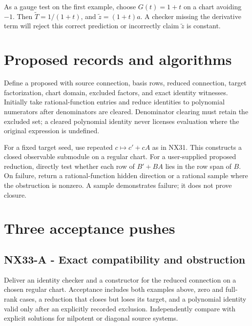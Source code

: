 \documentclass[
  11pt,
  a4paper,
]{report}
\let\nxtexttt\texttt
\renewcommand{\texttt}[1]{\nxtexttt{\seqsplit{#1}}}
\begin{document}
As a gauge test on the first example, choose \(G(t)=1+t\) on a chart
avoiding \(-1\). Then \(\widetilde T=1/(1+t)\), and
\(\widetilde z=(1+t)a\). A checker missing the derivative term will
reject this correct prediction or incorrectly claim \(\widetilde z\) is
constant.

\hypertarget{proposed-records-and-algorithms}{%
\section{Proposed records and
algorithms}\label{proposed-records-and-algorithms}}

Define a proposed \texttt{MovingQuotient} with source connection, basis
rows, reduced connection, target factorization, chart domain, excluded
factors, and exact identity witnesses. Initially take rational-function
entries and reduce identities to polynomial numerators after
denominators are cleared. Denominator clearing must retain the excluded
set; a cleared polynomial identity never licenses evaluation where the
original expression is undefined.

For a fixed target seed, use repeated \(c\mapsto c'+cA\) as in NX31.
This constructs a closed observable submodule on a regular chart. For a
user-supplied proposed reduction, directly test whether each row of
\(B'+BA\) lies in the row span of \(B\). On failure, return a
rational-function hidden direction or a rational sample where the
obstruction is nonzero. A sample demonstrates failure; it does not prove
closure.

\hypertarget{three-acceptance-pushes-9}{%
\section{Three acceptance pushes}\label{three-acceptance-pushes-9}}

\hypertarget{nx33-a---exact-compatibility-and-obstruction}{%
\subsection{NX33-A - Exact compatibility and
obstruction}\label{nx33-a---exact-compatibility-and-obstruction}}

Deliver an identity checker and a constructor for the reduced connection
on a chosen regular chart. Acceptance includes both examples above, zero
and full-rank cases, a reduction that closes but loses its target, and a
polynomial identity valid only after an explicitly recorded exclusion.
Independently compare with explicit solutions for nilpotent or diagonal
source systems.
\end{document}
